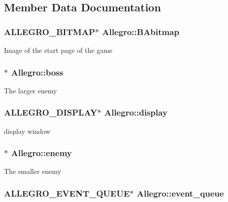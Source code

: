 \subsection{Member Data Documentation}
\hypertarget{classAllegro_ae10751d99b7a4921df87ac34b3757e24}{
\subsubsection[{BAbitmap}]{\setlength{\rightskip}{0pt plus 5cm}ALLEGRO\_\-BITMAP$\ast$ {\bf Allegro::BAbitmap}}}
\label{classAllegro_ae10751d99b7a4921df87ac34b3757e24}
Image of the start page of the game \hypertarget{classAllegro_a5711e0348cbd0cfa61bca6bb8badae45}{
\subsubsection[{boss}]{$\ast$ {\bf Allegro::boss}}}
\label{classAllegro_a5711e0348cbd0cfa61bca6bb8badae45}
The larger enemy \hypertarget{classAllegro_a3e51f319f189787a5341d3297727eba5}{
\subsubsection[{display}]{\setlength{\rightskip}{0pt plus 5cm}ALLEGRO\_\-DISPLAY$\ast$ {\bf Allegro::display}}}
\label{classAllegro_a3e51f319f189787a5341d3297727eba5}
display window \hypertarget{classAllegro_a70ea4292a405eb94fc4165fe19c7eaa4}{
\subsubsection[{enemy}]{$\ast$ {\bf Allegro::enemy}}}
\label{classAllegro_a70ea4292a405eb94fc4165fe19c7eaa4}
The smaller enemy \hypertarget{classAllegro_a4a2c1d6a0009b87fb04ac4726814623a}{
\subsubsection[{event\_\-queue}]{\setlength{\rightskip}{0pt plus 5cm}ALLEGRO\_\-EVENT\_\-QUEUE$\ast$ {\bf Allegro::event\_\-queue}}}

